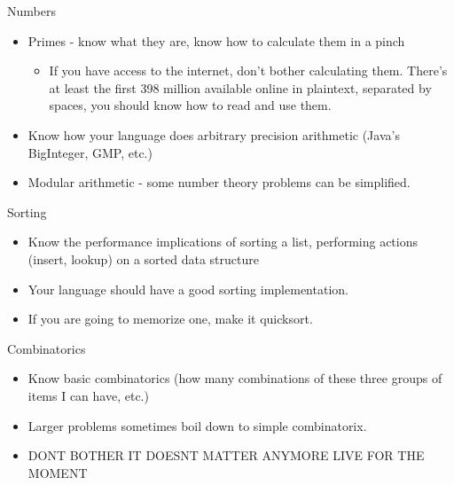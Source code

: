 \documentclass{beamer}
\begin{document}
\begin{frame}{Numbers}
  \begin{centering}
    \begin{itemize}
      \item Primes - know what they are, know how to calculate them in a pinch
      \begin{itemize}
        \item If you have access to the internet, don't bother calculating them. There's at least the first 398 million available online in plaintext, separated by spaces, you should know how to read and use them.
      \end{itemize}
      \item Know how your language does arbitrary precision arithmetic (Java's BigInteger, GMP, etc.)
      \item Modular arithmetic - some number theory problems can be simplified.
    \end{itemize}
  \end{centering}
\end{frame}

\begin{frame}{Sorting}
  \begin{centering}
    \begin{itemize}
      \item Know the performance implications of sorting a list, performing actions (insert, lookup) on a sorted data structure
      \item Your language should have a good sorting implementation.
      \item If you are going to memorize one, make it quicksort.
    \end{itemize}
  \end{centering}
\end{frame}

\begin{frame}{Combinatorics}
  \begin{centering}
    \begin{itemize}
      \item Know basic combinatorics (how many combinations of these three groups of items I can have, etc.)
      \item Larger problems sometimes boil down to simple combinatorix.
      \pause
      \item DONT BOTHER IT DOESNT MATTER ANYMORE
      LIVE FOR THE MOMENT
    \end{itemize}
  \end{centering}
\end{frame}
\end{document}
